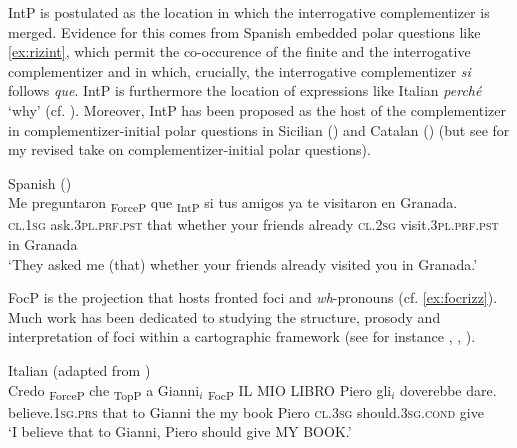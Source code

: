 
IntP is postulated as the location in which the interrogative complementizer is merged. Evidence for this comes  from Spanish embedded polar questions like \eqref{ex:rizint}, which permit the co-occurence of the finite and the interrogative complementizer and in which, crucially, the interrogative complementizer \emph{si} follows \emph{que}. IntP is furthermore the location of expressions like Italian \emph{perché} `why'  (cf. \citealt{Shlonsky2011}). Moreover, IntP has been proposed  as the host of the complementizer in complementizer-initial polar questions in Sicilian (\citealt{Cruschin2012}) and Catalan (\citealt{Kocher2017a}) (but see  for my revised take on complementizer-initial polar questions). 

\ea\label{ex:rizint}
Spanish (\citealt[349: ex 30b]{Suner1994})\\
\gll Me preguntaron {\ob}\textsubscript{ForceP} que{\cb} {\ob}\textsubscript{IntP} si{{\cb}} tus amigos ya te visitaron en Granada.\\
\textsc{cl.1sg} ask.\textsc{3pl.prf.pst} {} that {} whether your friends already \textsc{cl.2sg} visit.\textsc{3pl.prf.pst} in Granada\\
\glt`They asked me (that) whether your friends already visited you in Granada.' 
\z

FocP is the projection that hosts fronted foci and \textit{wh}-pronouns (cf. \ref{ex:focrizz}).  Much work has been dedicated to studying the structure, prosody and interpretation of foci within a cartographic framework (see for instance \citealt{Belletti2004},    \citealt{Cruschina2015a, Cruschina2017}, \citealt{Bianchi2016}).\largerpage[2]


\ea\label{ex:focrizz} Italian (adapted from \citealt[203: ex 5]{Rizzi2013}) \\ \gll Credo {\ob}\textsubscript{ForceP} che{\cb} {\ob}\textsubscript{TopP} a Gianni$_i${\cb} {\ob}\textsubscript{FocP} IL MIO LIBRO{\cb}  Piero gli$_i$ doverebbe dare. \\
believe.\textsc{1sg.prs} {} that {} to Gianni {} the my book  Piero \textsc{cl.3sg} should.\textsc{3sg.cond} give\\
\glt`I believe that to Gianni, Piero should give MY BOOK.' 
\z


